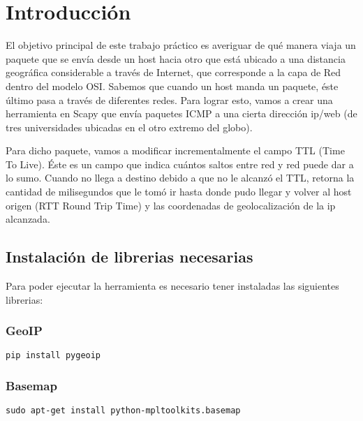 \section{Introducción}
\PARstart El objetivo principal de este trabajo práctico es averiguar de qué manera viaja un paquete que se envía 
desde un host hacia otro que está ubicado a una distancia geográfica considerable a través de Internet, 
que corresponde a la capa de Red dentro del modelo OSI.
Sabemos que cuando un host manda un paquete, éste último pasa a través de diferentes redes. Para lograr esto, 
vamos a crear una herramienta en Scapy que envía paquetes ICMP a una cierta dirección ip/web (de tres universidades ubicadas en el otro extremo del globo). 

Para dicho paquete, vamos a modificar incrementalmente el campo TTL (Time To Live). Éste es un campo que indica 
cuántos saltos entre red y red puede dar a lo sumo. Cuando no llega a destino debido a que no le alcanzó el TTL, 
retorna la cantidad de milisegundos que le tomó ir hasta donde pudo llegar y volver al host origen (RTT Round Trip Time)
y las coordenadas de geolocalización de la ip alcanzada.

\subsection{Instalación de librerias necesarias}

Para poder ejecutar la herramienta es necesario tener instaladas las siguientes librerias:

\subsubsection{GeoIP}
\begin{verbatim}
pip install pygeoip
\end{verbatim}

\subsubsection{Basemap}
\begin{verbatim}
sudo apt-get install python-mpltoolkits.basemap
\end{verbatim}